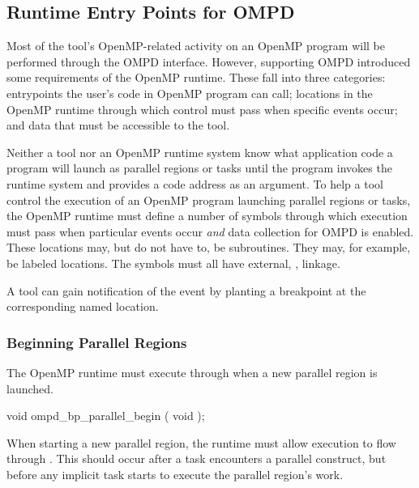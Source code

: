 \subsection{Runtime Entry Points for OMPD}
\label{subsec:runtime-entry-points-for-ompd}

Most of the tool's OpenMP-related activity on an OpenMP
program will be performed through the OMPD interface.
However, supporting OMPD introduced some requirements of the OpenMP
runtime.
These fall into three categories: entrypoints the user's code in
OpenMP program can call; locations in the OpenMP runtime through
which control must pass when specific events occur; and data that must
be accessible to the tool.

Neither a tool nor an OpenMP runtime system know what
application code a program will launch as parallel regions
or tasks until the program invokes the runtime system and
provides a code address as an argument.
To help a tool control the execution of an OpenMP program
launching parallel regions or tasks,
the OpenMP runtime must define a number of symbols
through which execution must pass when particular events occur
\emph{and} data collection for OMPD is enabled.
These locations may, but do not have to, be subroutines.
They may, for example, be labeled locations.
The symbols must all have external, , linkage.

A tool can gain notification of the event by planting a breakpoint
at the corresponding named location.

\subsubsection{Beginning Parallel Regions}
\label{subsubsec:ompd_bp_parallel_begin}

\summary
The OpenMP runtime must execute through
 when a new parallel region is launched.


\begin{cspecific}
\begin{ompSyntax}
void ompd_bp_parallel_begin ( void );
\end{ompSyntax}
\end{cspecific}


\descr

When starting a new parallel region, the runtime must allow execution
to flow through .
This should occur after a task encounters a parallel construct,
but before any implicit task starts to execute the parallel
region's work.

